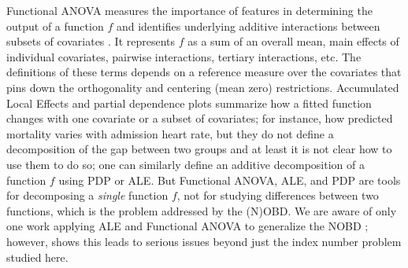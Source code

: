 Functional ANOVA measures the importance of features in determining the output of a function $f$ and identifies underlying additive interactions between subsets of covariates \citep{hooker2004discovering, hookerGeneralizedFunctionalANOVA2007}.
It represents $f$ as a sum of an overall mean, main effects of individual covariates, pairwise interactions, tertiary interactions, etc. The definitions of these terms depends on a reference measure over the covariates that pins down the orthogonality and centering (mean zero) restrictions.
Accumulated Local Effects \citep[ALE;][]{apley2020} and partial dependence plots \citep[PDP;][]{friedman2001greedy} summarize how a fitted function changes with one covariate or a subset of covariates; for instance, how predicted mortality varies with admission heart rate, but they do not define a decomposition of the gap between two groups and at least it is not clear how to use them to do so; one can similarly define an additive decomposition of a function $f$ using PDP or ALE.
But Functional ANOVA, ALE, and PDP are tools for decomposing a \emph{single} function $f$, not for studying differences between two functions, which is the problem addressed by the (N)OBD.
We are aware of only one work applying ALE and Functional ANOVA to generalize the NOBD \citep{quintero2025}; however, \citet{quintero2025} shows this leads to serious issues beyond just the index number problem studied here.


